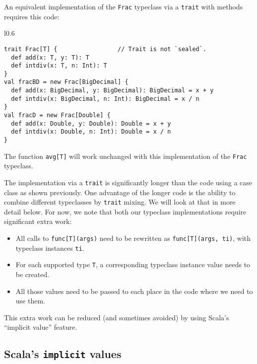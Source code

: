 An equivalent implementation of the \lstinline!Frac! typeclass via
a \lstinline!trait! with methods requires this code:

\begin{wrapfigure}{l}{0.6\columnwidth}%
\vspace{-0.65\baselineskip}
\begin{lstlisting}
trait Frac[T] {                 // Trait is not `sealed`.
  def add(x: T, y: T): T
  def intdiv(x: T, n: Int): T
}
val fracBD = new Frac[BigDecimal] {
  def add(x: BigDecimal, y: BigDecimal): BigDecimal = x + y
  def intdiv(x: BigDecimal, n: Int): BigDecimal = x / n
}
val fracD = new Frac[Double] {
  def add(x: Double, y: Double): Double = x + y
  def intdiv(x: Double, n: Int): Double = x / n
}
\end{lstlisting}

\vspace{-0.85\baselineskip}
\end{wrapfigure}%

\noindent The function \lstinline!avg[T]! will work unchanged with
this implementation of the \lstinline!Frac! typeclass.

The implementation via a \lstinline!trait! is significantly longer
than the code using a case class as shown previously. One advantage
of the longer code is the ability to combine different typeclasses
by \lstinline!trait! mixing. We will look at that in more detail
below. For now, we note that both our typeclass implementations require
significant extra work:
\begin{itemize}
\item All calls to \lstinline!func[T](args)! need to be rewritten as \lstinline!func[T](args, ti)!,
with typeclass instances \lstinline!ti!.
\item For each supported type \lstinline!T!, a corresponding typeclass
instance value needs to be created.
\item All those values need to be passed to each place in the code where
we need to use them.
\end{itemize}
This extra work can be reduced (and sometimes avoided) by using Scala's
``implicit value'' feature. 

\subsection{Scala's \texttt{implicit} values}

